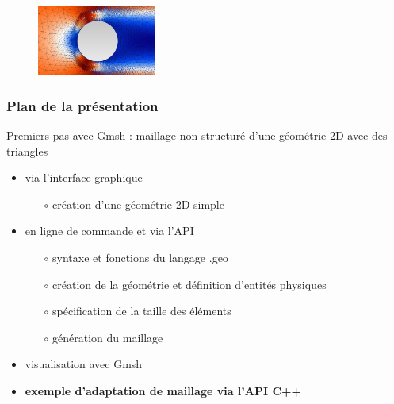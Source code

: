 \documentclass[aspectratio=169]{beamer}
\begin{document}
\begin{frame}[fragile]
\begin{figure}
  \hspace{0.6cm}
  \includegraphics[width=0.35\textwidth]{figures/zoom.png}
  \caption{}
  \label{}
\end{figure}
\end{frame}

\begin{frame}[fragile]
\frametitle{Plan de la présentation}
Premiers pas avec Gmsh : maillage non-structuré d'une géométrie 2D avec des triangles
\begin{itemize}
  \item via l'interface graphique
  \begin{itemize}
    \item[$\circ$] création d'une géométrie 2D simple
  \end{itemize}
  \item en ligne de commande et via l'API
  \begin{itemize}
    \item[$\circ$] syntaxe et fonctions du langage .geo
    \item[$\circ$] création de la géométrie et définition d'entités physiques
    \item[$\circ$] spécification de la taille des éléments
    \item[$\circ$] génération du maillage
  \end{itemize}
  \item visualisation avec Gmsh
  \item \textbf{exemple d'adaptation de maillage via l'API C++}
\end{itemize}
\end{frame}
\end{document}
